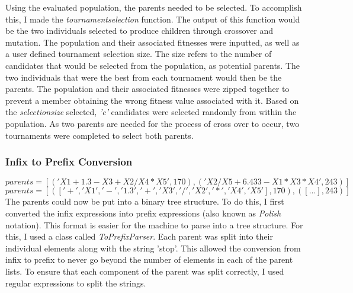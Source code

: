 \documentclass[11pt]{article}
\begin{document}
Using the evaluated population, the parents needed to be selected. To accomplish this, I made the \textit{tournament\textunderscore selection} function. The output of this function would be the two individuals selected to produce children through crossover and mutation. 
The population and their associated fitnesses were inputted, as well as a user defined tournament selection size. The size refers to the number of candidates that would be selected from the population, as potential parents. The two individuals that were the best from each tournament would then be the parents. The population and their associated fitnesses were zipped together to prevent a member obtaining the wrong fitness value associated with it. Based on the \textit{selection\textunderscore size} selected, \textit{'c'} candidates were selected randomly from within the population. As two parents are needed for the process of cross over to occur, two tournaments were completed to select both parents.
\subsubsection{Infix to Prefix Conversion}
\begin{equation}parents = [('X1+1.3-X3+X2/X4*X5',170),( 'X2/X5+6.433-X1*X3*X4',243)] \end{equation} \begin{equation}parents = [(['+', 'X1', '-', '1.3', '+', 'X3', '/', 'X2', '*', 'X4', 'X5'], 170),([...],243)] \end{equation}
The parents could now be put into a binary tree structure. To do this, I first converted the infix expressions into prefix expressions (also known as \textit{Polish} notation). This format is easier for the machine to parse into a tree structure.  For this, I used a class called \textit{ToPrefixParser}. Each parent was split into their individual elements along with the string 'stop'. This allowed the conversion from infix to prefix to never go beyond the number of elements in each of the parent lists. To ensure that each component of the parent was split correctly, I used regular expressions to split the strings. 
\end{document}
